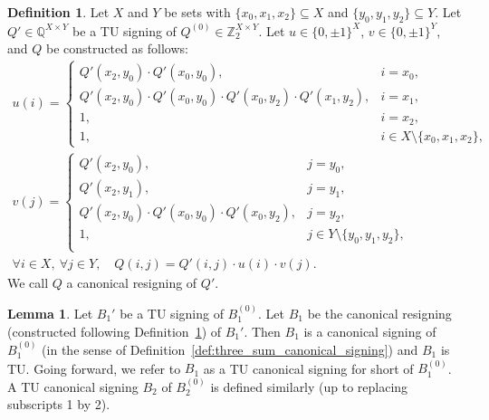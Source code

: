 \documentclass{article}
\theoremstyle{definition}
\newtheorem{lemma}[theorem]{Lemma}
\newtheorem{definition}[theorem]{Definition}
\begin{document}
\begin{definition}\label{def:three_sum_canonical_resigning}
    Let $X$ and $Y$ be sets with $\{x_{0}, x_{1}, x_{2}\} \subseteq X$ and $\{y_{0}, y_{1}, y_{2}\} \subseteq Y$. Let $Q' \in \mathbb{Q}^{X \times Y}$ be a TU signing of $Q^{(0)} \in \mathbb{Z}_{2}^{X \times Y}$. Let $u \in \{0, \pm 1\}^{X}$, $v \in \{0, \pm 1\}^{Y}$, and $Q$ be constructed as follows:
    \begin{gather*}
        u(i) = \begin{cases}
            Q' (x_{2}, y_{0}) \cdot Q' (x_{0}, y_{0}), & i = x_{0}, \\
            Q' (x_{2}, y_{0}) \cdot Q' (x_{0}, y_{0}) \cdot Q' (x_{0}, y_{2}) \cdot Q' (x_{1}, y_{2}), & i = x_{1}, \\
            1, & i = x_{2}, \\
            1, & i \in X \setminus \{x_{0}, x_{1}, x_{2}\},
        \end{cases} \\
        v(j) = \begin{cases}
            Q' (x_{2}, y_{0}), & j = y_{0}, \\
            Q' (x_{2}, y_{1}), & j = y_{1}, \\
            Q' (x_{2}, y_{0}) \cdot Q' (x_{0}, y_{0}) \cdot Q' (x_{0}, y_{2}), & j = y_{2}, \\
            1, & j \in Y \setminus \{y_{0}, y_{1}, y_{2}\}, \\
        \end{cases} \\
        \forall i \in X, \ \forall j \in Y, \quad Q (i, j) = Q' (i, j) \cdot u(i) \cdot v(j).
    \end{gather*}
    We call $Q$ a canonical resigning of $Q'$.
\end{definition}

\begin{lemma}\label{lem:three_sum_canonical_signing_construction}
    Let $B_{1}'$ be a TU signing of $B_{1}^{(0)}$. Let $B_{1}$ be the canonical resigning (constructed following Definition~\ref{def:three_sum_canonical_resigning}) of $B_{1}'$. Then $B_{1}$ is a canonical signing of $B_{1}^{(0)}$ (in the sense of Definition~\ref{def:three_sum_canonical_signing}) and $B_{1}$ is TU. Going forward, we refer to $B_{1}$ as a TU canonical signing for short of $B_{1}^{(0)}$. A TU canonical signing $B_{2}$ of $B_{2}^{(0)}$ is defined similarly (up to replacing subscripts 1 by 2).
\end{lemma}
\end{document}
